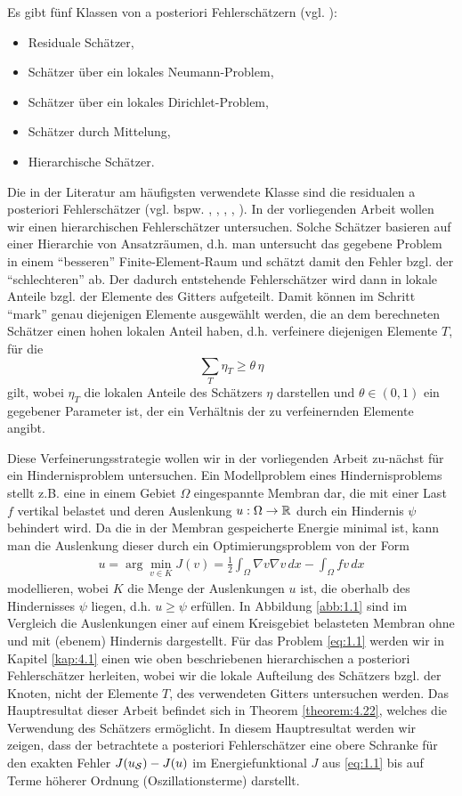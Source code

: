 Es gibt fünf Klassen von a posteriori Fehlerschätzern (vgl. \cite{BraeFEM}):
\begin{itemize}
\item Residuale Schätzer,
\item Schätzer über ein lokales Neumann-Problem,
\item Schätzer über ein lokales Dirichlet-Problem,
\item Schätzer durch Mittelung,
\item Hierarchische Schätzer.
\end{itemize}
Die in der Literatur  am häufigsten verwendete Klasse sind die residualen a posteriori Fehlerschätzer (vgl. bspw. \cite{BraeFEM}, \cite{BraeLook}, \cite{BraeCar}, \cite{BraeCar2}, \cite{MorNoc}). In der vorliegenden Arbeit wollen wir einen hierarchischen Fehlerschätzer untersuchen. Solche Schätzer basieren auf einer Hierarchie von Ansatzräumen, d.h. man untersucht das gegebene Problem in einem "`besseren"' Finite-Element-Raum und schätzt damit den Fehler bzgl. der "`schlechteren"'  ab. Der dadurch entstehende  Fehlerschätzer  wird dann in lokale Anteile bzgl. der Elemente des Gitters aufgeteilt. Damit können im Schritt "`mark"'  genau diejenigen Elemente ausgewählt werden, die an dem berechneten Schätzer einen hohen lokalen Anteil haben, d.h. verfeinere diejenigen Elemente $T$, für die
\[
	\sum_{T} \eta_T \ge \theta\, \eta 
\]
gilt, wobei $\eta_T$ die lokalen Anteile des Schätzers $\eta$ darstellen und $\theta \in (0,1)$ ein gegebener Parameter ist, der ein Verhältnis der zu verfeinernden Elemente angibt.

Diese Verfeinerungsstrategie wollen wir in der vorliegenden Arbeit zu-nächst für ein Hindernisproblem untersuchen. Ein Modellproblem eines Hindernisproblems stellt z.B. eine in einem Gebiet $\Omega$ eingespannte Membran dar, die mit einer Last $f$ vertikal belastet und deren Auslenkung $u: \Omega \rightarrow \mathbb{R}$ durch ein Hindernis $\psi$ behindert wird. Da die in der Membran gespeicherte Energie minimal ist, kann man die Auslenkung dieser durch ein Optimierungsproblem von der Form
\begin{align}\label{eq:1.1}
	u = \arg\min_{v \in K} J(v) = \frac 12 \int_{\Omega} \nabla v \nabla v \, dx - \int_\Omega f v \, dx
\end{align}
modellieren, wobei $K$ die Menge der Auslenkungen $u$ ist, die oberhalb des Hindernisses $\psi$ liegen, d.h. $u\ge \psi$ erfüllen.  In Abbildung \ref{abb:1.1} sind im Vergleich die Auslenkungen einer auf einem Kreisgebiet belasteten Membran ohne und mit (ebenem) Hindernis dargestellt. Für das Problem \eqref{eq:1.1} werden wir in Kapitel \ref{kap:4.1} einen wie oben beschriebenen hierarchischen a posteriori Fehlerschätzer herleiten, wobei wir die lokale Aufteilung des Schätzers bzgl. der Knoten, nicht der Elemente $T$, des verwendeten Gitters untersuchen werden. Das Hauptresultat dieser Arbeit befindet sich in Theorem \ref{theorem:4.22}, welches  die Verwendung des Schätzers ermöglicht. In diesem Hauptresultat werden wir zeigen, dass der betrachtete a posteriori Fehlerschätzer eine obere Schranke für den exakten Fehler $J(u_{\mathcal S}) - J(u)$ im Energiefunktional $J$ aus \eqref{eq:1.1} bis auf Terme höherer Ordnung (Oszillationsterme) darstellt.


